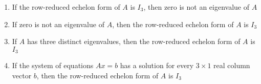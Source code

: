 \documentclass[journal]{IEEEtran}
\begin{document}
\begin{enumerate}
{\begin{enumerate}
    \item If the row-reduced echelon form of $A$ is $I_3$, then zero is not an eigenvalue of $A$
    \item If zero is not an eigenvalue of $A$, then the row-reduced echelon form of $A$ is $I_3$
    \item If $A$ has three distinct eigenvalues, then the row-reduced echelon form of $A$ is $I_3$
    \item If the system of equations $Ax=b$ has a solution for every $3\times 1$ real column vector $b$, then the row-reduced echelon form of $A$ is $I_3$
\end{enumerate}

}
\end{enumerate}
\end{document}
